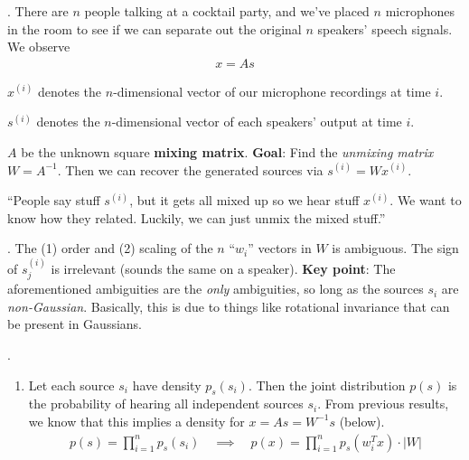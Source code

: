 \documentclass[12pt]{article}
\begin{document}
\myspace 
\p {}. There are $n$ people talking at a cocktail party, and we've placed $n$ microphones in the room to see if we can separate out the original $n$ speakers' speech signals. We observe
\begin{align}
x = As
\end{align}
\begin{compactitem}[$\rightarrow$]
	\item $x^{(i)}$ denotes the $n$-dimensional vector of our microphone recordings at time $i$. 
	\item $s^{(i)}$ denotes the $n$-dimensional vector of each speakers' output at time $i$. 
	\item $A$ be the unknown square \textbf{mixing matrix}. \textbf{Goal}: Find the \textit{unmixing matrix} $W = A^{-1}$. Then we can recover the generated sources via $s^{(i)} = W x^{(i)}$. 
\end{compactitem}
\red{[ELI5]} ``People say stuff $s^{(i)}$, but it gets all mixed up so we hear stuff $x^{(i)}$. We want to know how they related. Luckily, we can just unmix the mixed stuff.''

\myspace
\p {}. The (1) order and (2) scaling of the $n$ ``$w_i$'' vectors in $W$ is ambiguous. The sign of $s_j^(i)$ is irrelevant (sounds the same on a speaker). \textbf{Key point}: The aforementioned ambiguities are the \textit{only} ambiguities, so long as the sources $s_i$ are \textit{non-Gaussian}. Basically, this is due to things like rotational invariance that can be present in Gaussians.


\myspace
\p {}. 
\begin{enumerate}
	\item Let each source $s_i$ have density $p_s(s_i)$. Then the joint distribution $p(s)$ is the probability of hearing all independent sources $s_i$. From previous results, we know that this implies a density for $x = As = W^{-1}s$ (below). 
	\begin{align}
		p(s) = \prod_{i = 1}^{n} p_s(s_i) \quad \implies \quad
		p(x) = \prod_{i = 1}^{n} p_s(w_i^T x) \cdot |W|
	\end{align}
	
\end{enumerate}
\end{document}
